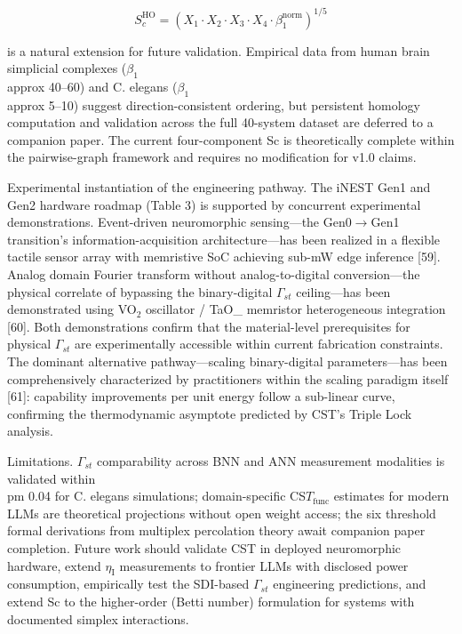 \documentclass[a4paper,12pt]{article}
\begin{document}
\begin{equation}
S_c^{\text{HO}} = (X_1 \cdot X_2 \cdot X_3 \cdot X_4 \cdot \beta_1^{\text{norm}})^{1/5}
\end{equation}


is a natural extension for future validation. Empirical data from human brain simplicial complexes ($\beta_1$  \\approx  40--60) and C. elegans ($\beta_1$  \\approx  5--10) suggest direction-consistent ordering, but persistent homology computation and validation across the full 40-system dataset are deferred to a companion paper. The current four-component Sc is theoretically complete within the pairwise-graph framework and requires no modification for v1.0 claims.


Experimental instantiation of the engineering pathway. The iNEST Gen1 and Gen2 hardware roadmap (Table 3) is supported by concurrent experimental demonstrations. Event-driven neuromorphic sensing---the Gen0$\rightarrow$Gen1 transition's information-acquisition architecture---has been realized in a flexible tactile sensor array with memristive SoC achieving sub-mW edge inference [59]. Analog domain Fourier transform without analog-to-digital conversion---the physical correlate of bypassing the binary-digital $\Gamma_{st}$ ceiling---has been demonstrated using VO$_2$ oscillator / TaO_{} memristor heterogeneous integration [60]. Both demonstrations confirm that the material-level prerequisites for physical $\Gamma_{st}$ are experimentally accessible within current fabrication constraints. The dominant alternative pathway---scaling binary-digital parameters---has been comprehensively characterized by practitioners within the scaling paradigm itself [61]: capability improvements per unit energy follow a sub-linear curve, confirming the thermodynamic asymptote predicted by CST's Triple Lock analysis.


Limitations. $\Gamma_{st}$ comparability across BNN and ANN measurement modalities is validated within  \\pm 0.04 for C. elegans simulations; domain-specific CS$T_{\text{func}}$ estimates for modern LLMs are theoretical projections without open weight access; the six threshold formal derivations from multiplex percolation theory await companion paper completion. Future work should validate CST in deployed neuromorphic hardware, extend $\eta_{\text{I}}$ measurements to frontier LLMs with disclosed power consumption, empirically test the SDI-based $\Gamma_{st}$ engineering predictions, and extend Sc to the higher-order (Betti number) formulation for systems with documented simplex interactions.
\end{document}
